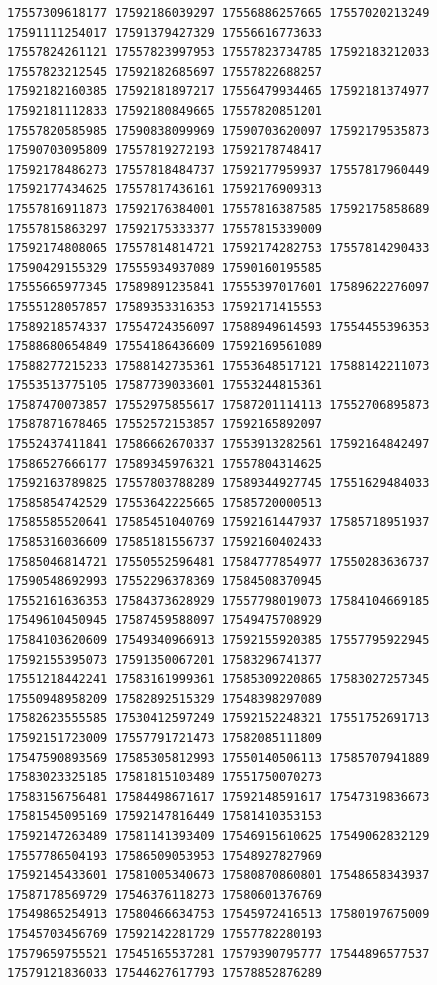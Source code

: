 \documentclass[10pt]{article}
\begin{document}
\begin{verbatim}
17557309618177 17592186039297 17556886257665 17557020213249 17591111254017 17591379427329 17556616773633
17557824261121 17557823997953 17557823734785 17592183212033 17557823212545 17592182685697 17557822688257
17592182160385 17592181897217 17556479934465 17592181374977 17592181112833 17592180849665 17557820851201
17557820585985 17590838099969 17590703620097 17592179535873 17590703095809 17557819272193 17592178748417
17592178486273 17557818484737 17592177959937 17557817960449 17592177434625 17557817436161 17592176909313
17557816911873 17592176384001 17557816387585 17592175858689 17557815863297 17592175333377 17557815339009
17592174808065 17557814814721 17592174282753 17557814290433 17590429155329 17555934937089 17590160195585
17555665977345 17589891235841 17555397017601 17589622276097 17555128057857 17589353316353 17592171415553
17589218574337 17554724356097 17588949614593 17554455396353 17588680654849 17554186436609 17592169561089
17588277215233 17588142735361 17553648517121 17588142211073 17553513775105 17587739033601 17553244815361
17587470073857 17552975855617 17587201114113 17552706895873 17587871678465 17552572153857 17592165892097
17552437411841 17586662670337 17553913282561 17592164842497 17586527666177 17589345976321 17557804314625
17592163789825 17557803788289 17589344927745 17551629484033 17585854742529 17553642225665 17585720000513
17585585520641 17585451040769 17592161447937 17585718951937 17585316036609 17585181556737 17592160402433
17585046814721 17550552596481 17584777854977 17550283636737 17590548692993 17552296378369 17584508370945
17552161636353 17584373628929 17557798019073 17584104669185 17549610450945 17587459588097 17549475708929
17584103620609 17549340966913 17592155920385 17557795922945 17592155395073 17591350067201 17583296741377
17551218442241 17583161999361 17585309220865 17583027257345 17550948958209 17582892515329 17548398297089
17582623555585 17530412597249 17592152248321 17551752691713 17592151723009 17557791721473 17582085111809
17547590893569 17585305812993 17550140506113 17585707941889 17583023325185 17581815103489 17551750070273
17583156756481 17584498671617 17592148591617 17547319836673 17581545095169 17592147816449 17581410353153
17592147263489 17581141393409 17546915610625 17549062832129 17557786504193 17586509053953 17548927827969
17592145433601 17581005340673 17580870860801 17548658343937 17587178569729 17546376118273 17580601376769
17549865254913 17580466634753 17545972416513 17580197675009 17545703456769 17592142281729 17557782280193
17579659755521 17545165537281 17579390795777 17544896577537 17579121836033 17544627617793 17578852876289

\end{verbatim}
\end{document}
